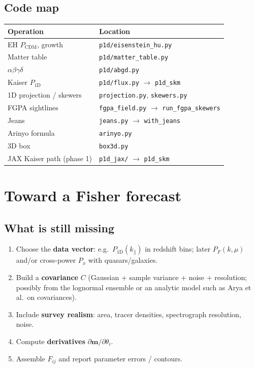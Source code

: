 \documentclass[11pt]{article}
\begin{document}
\subsection{Code map}

\begin{center}
\small
\begin{tabular}{@{}p{}p{}@{}}
\toprule
Operation & Location \\
\midrule
EH $P_\mathrm{CDM}$, growth & \texttt{p1d/eisenstein\_hu.py} \\
Matter table & \texttt{p1d/matter\_table.py} \\
$\alpha\beta\gamma\delta$ & \texttt{p1d/abgd.py} \\
Kaiser $P_{1\mathrm{D}}$ & \texttt{p1d/flux.py} $\to$ \texttt{p1d\_skm} \\
1D projection / skewers & \texttt{projection.py}, \texttt{skewers.py} \\
FGPA sightlines & \texttt{fgpa\_field.py} $\to$ \texttt{run\_fgpa\_skewers} \\
Jeans & \texttt{jeans.py} $\to$ \texttt{with\_jeans} \\
Arinyo formula & \texttt{arinyo.py} \\
3D box & \texttt{box3d.py} \\
JAX Kaiser path (phase 1) & \texttt{p1d\_jax/} $\to$ \texttt{p1d\_skm} \\
\bottomrule
\end{tabular}
\end{center}

\newpage
\section{Toward a Fisher forecast}

\subsection{What is still missing}

\begin{enumerate}
\item Choose the \textbf{data vector}: e.g.\ $P_{1\mathrm{D}}(k_\parallel)$ in redshift bins; later $P_F(k,\mu)$ and/or cross-power $P_x$ with quasars/galaxies.
\item Build a \textbf{covariance} $C$ (Gaussian + sample variance + noise + resolution; possibly from the lognormal ensemble or an analytic model such as Arya et al.\ on covariances).
\item Include \textbf{survey realism}: area, tracer densities, spectrograph resolution, noise.
\item Compute \textbf{derivatives} $\partial\mathbf{m}/\partial\theta_i$.
\item Assemble $F_{ij}$ and report parameter errors / contours.
\end{enumerate}
\end{document}

